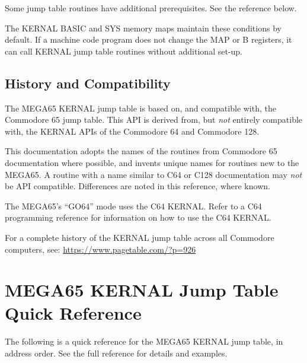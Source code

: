 Some jump table routines have additional prerequisites. See the reference below.

The KERNAL BASIC and SYS memory maps maintain these conditions by default. If a machine code program does not change the MAP or B registers, it can call KERNAL jump table routines without additional set-up.

\subsection{History and Compatibility}

The MEGA65 KERNAL jump table is based on, and compatible with, the Commodore 65 jump table. This API is derived from, but \emph{not} entirely compatible with, the KERNAL APIs of the Commodore 64 and Commodore 128.

This documentation adopts the names of the routines from Commodore 65 documentation where possible, and invents unique names for routines new to the MEGA65. A routine with a name similar to C64 or C128 documentation may \emph{not} be API compatible. Differences are noted in this reference, where known.

The MEGA65's ``GO64'' mode uses the C64 KERNAL. Refer to a C64 programming reference for information on how to use the C64 KERNAL.

For a complete history of the KERNAL jump table across all Commodore computers, see: \url{https://www.pagetable.com/?p=926}

\newpage
\section{MEGA65 KERNAL Jump Table Quick Reference}

The following is a quick reference for the MEGA65 KERNAL jump table, in address order. See the full reference for details and examples.

